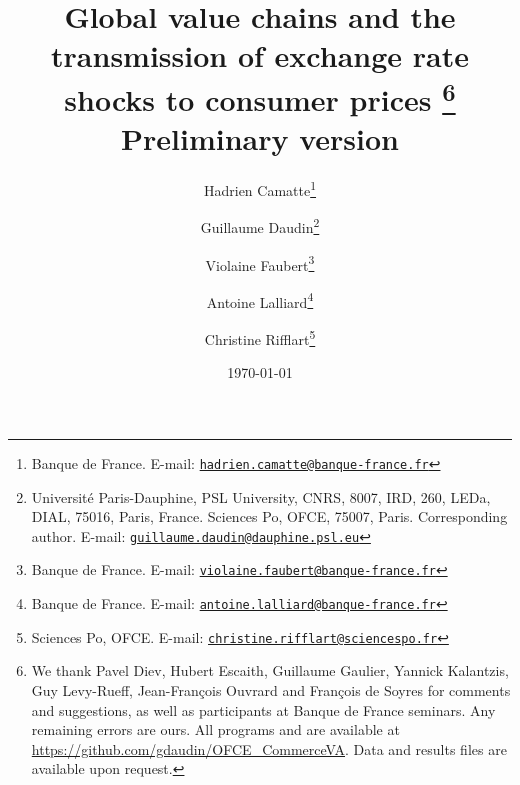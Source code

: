 \documentclass[11pt,a4paper]{article}
\newcommand{\email}[1]{\href{mailto:#1}{\nolinkurl{#1}}}
\begin{document}
\title{Global value chains and the transmission of exchange rate shocks to consumer prices	\thanks{We thank Pavel Diev, Hubert Escaith, Guillaume Gaulier, Yannick Kalantzis, Guy Levy-Rueff, Jean-François Ouvrard and François de Soyres for comments and suggestions, as well as participants at Banque de France seminars. Any remaining errors are ours. All programs and are available at \url{https://github.com/gdaudin/OFCE_CommerceVA}. Data and results files are available upon request.}\\
\vspace{1cm}
\normalsize{Preliminary version}
}
\vspace{1cm}
\date{\today}
\author{
	Hadrien Camatte\thanks{Banque de France. E-mail: \email{hadrien.camatte@banque-france.fr}}
	\and
	Guillaume Daudin\thanks{Université Paris-Dauphine, PSL University, CNRS, 8007, IRD, 260, LEDa, DIAL, 75016, Paris, France. Sciences Po, OFCE, 75007, Paris. Corresponding author. E-mail: \email{guillaume.daudin@dauphine.psl.eu}}
	\and
	Violaine Faubert\thanks{Banque de France. E-mail: \email{violaine.faubert@banque-france.fr}}
	\and
	Antoine Lalliard\thanks{Banque de France. E-mail: \email{antoine.lalliard@banque-france.fr}}
	\and
	Christine Rifflart\thanks{Sciences Po, OFCE. E-mail: \email{christine.rifflart@sciencespo.fr}}
}
\maketitle
\end{document}
